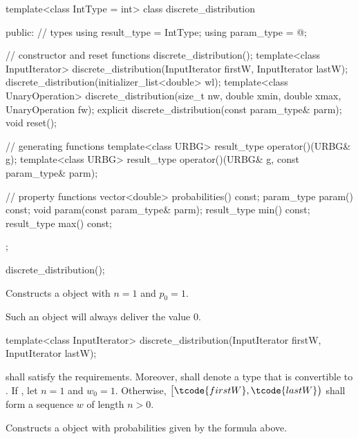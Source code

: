 %
\begin{codeblock}
template<class IntType = int>
  class discrete_distribution {
  public:
    // types
    using result_type = IntType;
    using param_type  = @\unspec@;

    // constructor and reset functions
    discrete_distribution();
    template<class InputIterator>
      discrete_distribution(InputIterator firstW, InputIterator lastW);
    discrete_distribution(initializer_list<double> wl);
    template<class UnaryOperation>
      discrete_distribution(size_t nw, double xmin, double xmax, UnaryOperation fw);
    explicit discrete_distribution(const param_type& parm);
    void reset();

    // generating functions
    template<class URBG>
      result_type operator()(URBG& g);
    template<class URBG>
      result_type operator()(URBG& g, const param_type& parm);

    // property functions
    vector<double> probabilities() const;
    param_type param() const;
    void param(const param_type& parm);
    result_type min() const;
    result_type max() const;
  };
\end{codeblock}

\begin{itemdecl}
discrete_distribution();
\end{itemdecl}

\begin{itemdescr}
\pnum\effects Constructs a  object
with $n = 1$ and $p_0 = 1$.
\begin{note}
Such an object will always deliver the value $0$.
\end{note}
\end{itemdescr}


%
\begin{itemdecl}
template<class InputIterator>
  discrete_distribution(InputIterator firstW, InputIterator lastW);
\end{itemdecl}

\begin{itemdescr}
\pnum
\requires
   shall satisfy the
   requirements.
  Moreover,
  shall denote a type that is convertible to .
 If ,
 let $n = 1$ and $w_0 = 1$.
 Otherwise,
 $\bigl[\tcode{firstW}, \tcode{lastW}\bigr)$
 shall form a sequence $w$ of length $n > 0$.

\pnum
\effects Constructs a  object
with probabilities given by the formula above.
\end{itemdescr}


